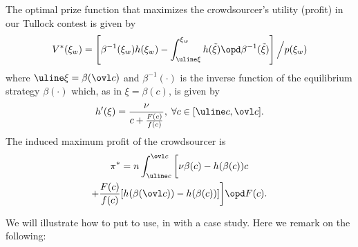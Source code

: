 \documentclass{sig-alternate-10pt}
\begin{document}
\begin{thm}\label{thm:optimal}
The optimal prize function that maximizes the crowdsourcer's utility (profit) in our Tullock contest is given by
\begin{align}\label{eq:opt-prize}
V^*(\xi_w) = \left[ \beta^{-1}(\xi_w) h(\xi_w)
- \int_{\uline \xi}^{\xi_w} h(\tilde \xi) \opd \beta^{-1}(\tilde \xi) \right]
\Big/ p(\xi_w)
\end{align}
where $\uline\xi=\beta(\ovl c)$ and $\beta^{-1}(\cdot)$ is the inverse function of the equilibrium strategy $\beta(\cdot)$ which, as in $\xi=\beta(c)$, is given by
\begin{align}\label{eq:opt-strategy}
h'(\xi) = \frac{\nu}{c + \frac{F(c)}{f(c)}},\; \forall c\in[\uline c,\ovl c].
\end{align}
The induced maximum profit of the crowdsourcer is
\begin{multline}\label{eq:profit}
\pi^* = n \int_{\uline c}^{\ovl c} \bigg[ 
\nu \beta(c) - h(\beta(c)) c \\
+ \frac{F(c)}{f(c)} [ h(\beta(\ovl c)) - h(\beta(c)) ] 	 \bigg] \opd F(c).
\end{multline}
\end{thm}
We will illustrate how to put  to use, in  with a case study. Here we remark on the following:
\end{document}

